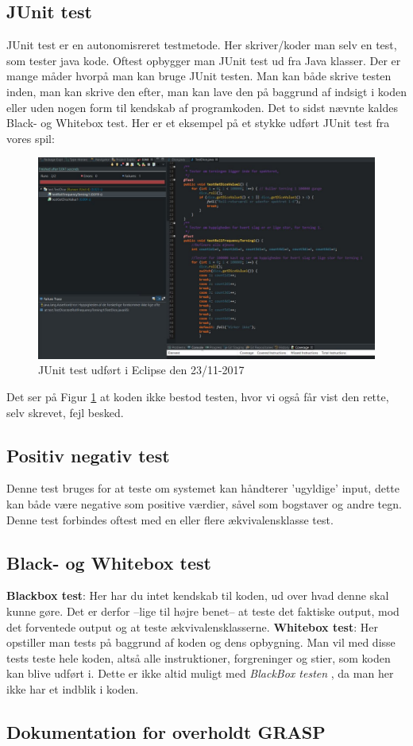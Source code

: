     \subsection{JUnit test}
        JUnit test er en autonomisreret testmetode. Her skriver/koder man selv en test, som tester java kode. Oftest opbygger man JUnit test ud fra Java klasser.
        Der er mange måder hvorpå man kan bruge JUnit testen. Man kan både skrive testen inden, man kan skrive den efter, man kan lave den på baggrund af indsigt i koden eller uden nogen form til kendskab af programkoden. Det to sidst nævnte kaldes Black- og Whitebox test.
        Her er et eksempel på et stykke udført JUnit test fra vores spil:
            \begin{figure}[h]\label{fig:JUnitTest} %
                \advance\leftskip-3cm
                \includegraphics[width=20cm]{fig/JUnitTestDice.jpg}
                \caption{JUnit test udført i Eclipse den 23/11-2017}
            \end{figure}
        Det ser på Figur \ref{fig:JUnitTest} at koden ikke bestod testen, hvor vi også får vist den rette, selv skrevet, fejl besked.

    \subsection{Positiv negativ test}
        Denne test bruges for at teste om systemet kan håndterer 'ugyldige' input, dette kan både være negative som positive værdier, såvel som bogstaver og andre tegn. Denne test forbindes oftest med en eller flere ækvivalensklasse test.
    \subsection{Black- og Whitebox test}
        \textbf{Blackbox test}: Her har du intet kendskab til koden, ud over hvad denne skal kunne gøre. Det er derfor --lige til højre benet-- at teste det faktiske output, mod det forventede output og at teste ækvivalensklasserne.
        \textbf{Whitebox test}: Her opstiller man tests på baggrund af koden og dens opbygning. Man vil med disse tests teste hele koden, altså alle instruktioner, forgreninger og stier, som koden kan blive udført i. Dette er ikke altid muligt med \textit{BlackBox testen} , da man her ikke har et indblik i koden.

\subsection{Dokumentation for overholdt GRASP}

